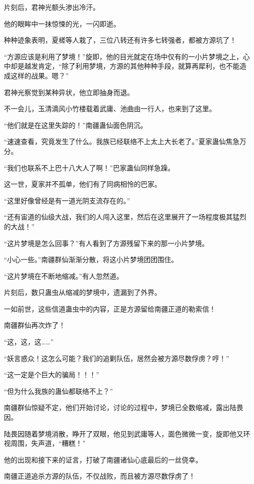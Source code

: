 \begin{this_body}
片刻后，君神光额头渗出冷汗。

他的眼眸中一抹惊悚的光，一闪即逝。

种种迹象表明，夏槎等人栽了，三位八转还有许多七转强者，都被方源坑了！

“方源应该是利用了梦境！”旋即，他的目光就定在场中仅有的一小片梦境之上，心中却是越发肯定，“除了利用梦境，方源的其他种种手段，就算再犀利，也不能造成这样的战果。嗯？”

君神光察觉到某种异状，他立即抽身而退。

不一会儿，玉清滴风小竹楼载着武庸、池曲由一行人，也来到了这里。

“他们就是在这里失踪的！”南疆蛊仙面色阴沉。

“速速查看，究竟发生了什么。我族已经联络不上太上大长老了。”夏家蛊仙焦急万分。

“我们也联系不上巴十八大人了啊！”巴家蛊仙同样急躁。

这一世，夏家并不孤单，他们有了同病相怜的巴家。

“这里好像曾经是有一道光阴支流存在的。”

“还有宙道的仙级大战，我们的人闯入这里，然后在这里展开了一场程度极其猛烈的大战！”

“这片梦境是怎么回事？”有人看到了方源残留下来的那一小片梦境。

“小心一些。”南疆群仙渐渐分散，将这小片梦境团团围住。

“这片梦境在不断地缩减。”有人忽然道。

片刻后，数只蛊虫从缩减的梦境中，遗漏到了外界。

一如前世，这些信道蛊虫中的内容，正是方源留给南疆正道的勒索信！

南疆群仙再次炸了！

“这，这，这……”

“妖言惑众！这怎么可能？我们的追剿队伍，居然会被方源尽数俘虏？哼！”

“这一定是个巨大的骗局！！！”

“但为什么我族的蛊仙都联络不上？”

南疆群仙惊疑不定，他们开始讨论，讨论的过程中，梦境已全数缩减，露出陆畏因。

陆畏因随着梦境消散，睁开了双眼，他见到武庸等人，面色微微一变，旋即他又环视周围，失声道，“糟糕！”

他的出现和接下来的证言，打破了南疆诸仙心底最后的一丝侥幸。

南疆正道追杀方源的队伍，不仅战败，而且被方源尽数俘虏了！


\end{this_body}
